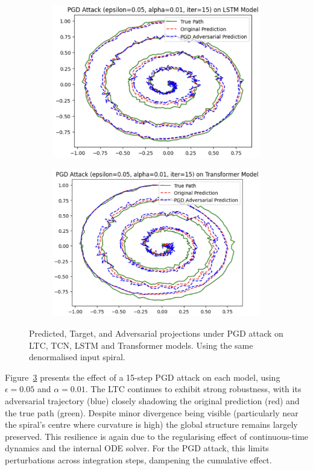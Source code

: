 \begin{figure}[H]
\begin{subfigure}[b]{0.45\linewidth}
        \includegraphics[width=\linewidth]{img/pgd_spiral_lstm.png}
        \label{fig:pgd_spiral_lstm}
    \end{subfigure}
    \hfill
    \begin{subfigure}[b]{0.45\linewidth}
        \includegraphics[width=\linewidth]{img/pgd_spiral_transformer.png}
        \label{fig:pgd_spiral_transformer}
    \end{subfigure}
    \caption{Predicted, Target, and Adversarial projections under PGD attack on LTC, TCN, LSTM and Transformer models. Using the same denormalised input spiral.}
    \label{fig:pgd_spirals}
\end{figure}

Figure~\ref{fig:pgd_spirals} presents the effect of a 15-step PGD attack on each model, using $\epsilon = 0.05$ and $\alpha = 0.01$. The LTC continues to exhibit strong robustness, with its adversarial trajectory (blue) closely shadowing the original prediction (red) and the true path (green). Despite minor divergence being visible (particularly near the spiral's centre where curvature is high) the global structure remains largely preserved. This resilience is again due to the regularising effect of continuous-time dynamics and the internal ODE solver. For the PGD attack, this limits perturbations across integration steps, dampening the cumulative effect.

